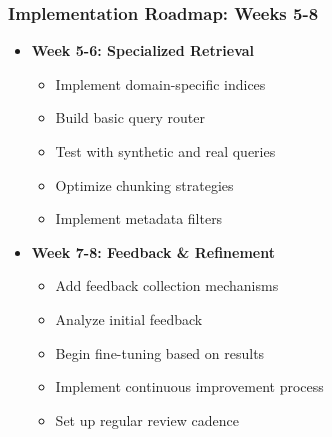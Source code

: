 {    \begin{frame}
        \frametitle{Implementation Roadmap: Weeks 5-8}
        \begin{itemize}
            \item \textbf{Week 5-6: Specialized Retrieval}
            \begin{itemize}
                \item Implement domain-specific indices
                \item Build basic query router
                \item Test with synthetic and real queries
                \item Optimize chunking strategies
                \item Implement metadata filters
            \end{itemize}
            \item \textbf{Week 7-8: Feedback \& Refinement}
            \begin{itemize}
                \item Add feedback collection mechanisms
                \item Analyze initial feedback
                \item Begin fine-tuning based on results
                \item Implement continuous improvement process
                \item Set up regular review cadence
            \end{itemize}
        \end{itemize}
    \end{frame}
} %